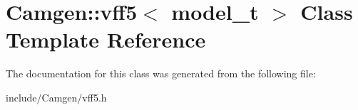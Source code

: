 \hypertarget{a00588}{}\section{Camgen\+:\+:vff5$<$ model\+\_\+t $>$ Class Template Reference}
\label{a00588}


The documentation for this class was generated from the following file\+:\begin{DoxyCompactItemize}
\item 
include/\+Camgen/vff5.\+h\end{DoxyCompactItemize}
